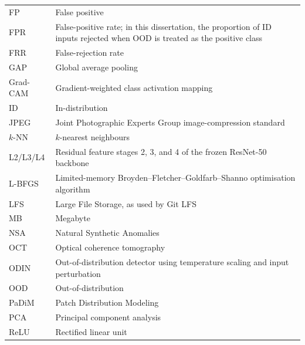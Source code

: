 \documentclass[fleqn,12pt]{olplainarticle}
\begin{document}
\begin{longtable}{@{}p{}p{}@{}}
    FP
    & False positive \\

    FPR
    & False-positive rate; in this dissertation, the proportion of ID inputs
      rejected when OOD is treated as the positive class \\

    FRR
    & False-rejection rate \\

    GAP
    & Global average pooling \\

    Grad-CAM
    & Gradient-weighted class activation mapping \\

    ID
    & In-distribution \\

    JPEG
    & Joint Photographic Experts Group image-compression standard \\

    $k$-NN
    & $k$-nearest neighbours \\

    L2/L3/L4
    & Residual feature stages 2, 3, and 4 of the frozen ResNet-50 backbone \\

    L-BFGS
    & Limited-memory Broyden--Fletcher--Goldfarb--Shanno optimisation
      algorithm \\

    LFS
    & Large File Storage, as used by Git LFS \\

    MB
    & Megabyte \\

    NSA
    & Natural Synthetic Anomalies \\

    OCT
    & Optical coherence tomography \\

    ODIN
    & Out-of-distribution detector using temperature scaling and input
      perturbation \\

    OOD
    & Out-of-distribution \\

    PaDiM
    & Patch Distribution Modeling \\

    PCA
    & Principal component analysis \\

    ReLU
    & Rectified linear unit \\


\end{longtable}
\end{document}
